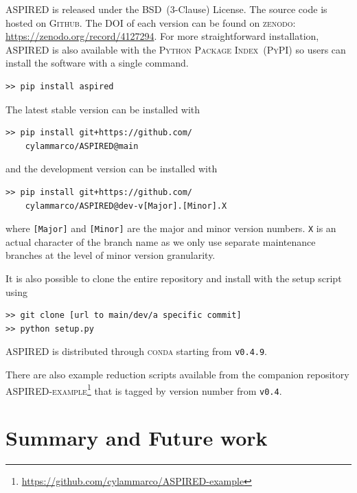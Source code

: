 \documentclass[linenumbers, twocolumn]{aastex631}
\begin{document}
\textsc{ASPIRED} is released under the BSD~(3-Clause) License. The source code
is hosted on \textsc{Github}. The DOI of each version can be found on 
\textsc{zenodo}: \url{https://zenodo.org/record/4127294}. For more
straightforward installation, \textsc{ASPIRED} is also available with the
\textsc{Python Package Index}~(\textsc{PyPI}) so users can install the software with a single command. 
\begin{verbatim}
>> pip install aspired
\end{verbatim}
The latest stable version can be installed with
\begin{verbatim}
>> pip install git+https://github.com/
    cylammarco/ASPIRED@main
\end{verbatim}
and the development version can be installed with 
\begin{verbatim}
>> pip install git+https://github.com/
    cylammarco/ASPIRED@dev-v[Major].[Minor].X
\end{verbatim} where \verb+[Major]+ and \verb+[Minor]+ are the major and minor
version numbers. \verb+X+ is an actual character of the branch name as we only
use separate maintenance branches at the level of minor version granularity.

It is also possible to clone the entire repository
and install with the setup script using
\begin{verbatim}
>> git clone [url to main/dev/a specific commit]
>> python setup.py
\end{verbatim}
ASPIRED is distributed through \textsc{conda} starting from \texttt{v0.4.9}.

There are also example reduction scripts available from the companion repository
\textsc{ASPIRED-example}\footnote{\url{https://github.com/cylammarco/ASPIRED-example}}
that is tagged by version number from \texttt{v0.4}.


\section{Summary and Future work}
\label{sec:summary}
\end{document}
